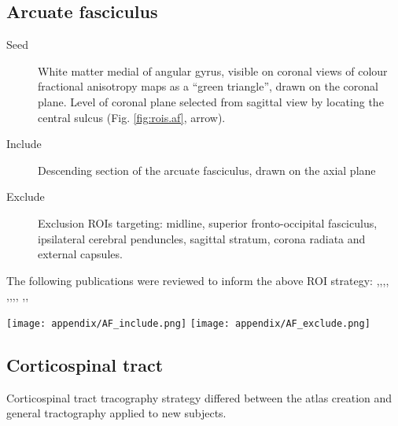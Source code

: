 \subsection{Arcuate fasciculus}

\begin{description}
  \item[Seed] White matter medial of angular gyrus, visible on coronal views of colour fractional anisotropy maps as a ``green triangle'', drawn on the coronal plane.
  Level of coronal plane selected from sagittal view by locating the central sulcus (Fig. \ref{fig:rois.af}, arrow).
  \item[Include] Descending section of the arcuate fasciculus, drawn on the axial plane
  \item[Exclude] Exclusion ROIs targeting: midline, superior fronto-occipital fasciculus, ipsilateral cerebral penduncles, sagittal stratum, corona radiata and external capsules.
\end{description}

The following publications were reviewed to inform the above ROI strategy: \textcite{Brown2014a},\textcite{Catani2002},\textcite{Catani2005},\textcite{Chen2015c},
\textcite{Eluvathingal2007},\textcite{Kamali2014},\textcite{Martino2013a},\textcite{Nucifora2005},
\textcite{Parker2005},\textcite{Bain2019},\textcite{Talozzi2018}

\begin{figure*}[h]
  \centering
    \texttt{[image: appendix/AF\_include.png]}
    \texttt{[image: appendix/AF\_exclude.png]}
  \caption{Seed (yellow), inclusion (green) and exclusion (red) regions of interest for the arcuate fasciculus. Arrow indicates central sulcus, landmark for seed ROI.}
  \label{fig:rois.af}
\end{figure*}

\subsection{Corticospinal tract}

Corticospinal tract tracography strategy differed between the atlas creation and general tractography applied to new subjects.

